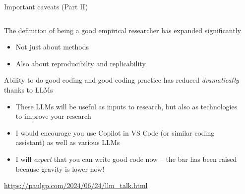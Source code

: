 \documentclass[notes,11pt, aspectratio=169]{beamer}
\newenvironment{wideitemize}{\itemize\addtolength{\itemsep}{10pt}}{\enditemize}
\begin{document}
\begin{frame}{Important caveats (Part II)}
  \begin{columns}[T] %
  \begin{column}{.7\textwidth}
    \begin{wideitemize}
    \item The definition of being a good empirical researcher has expanded significantly
      \begin{itemize}
        \item Not just about methods
        \item Also about reproducibilty and replicability
      \end{itemize}
    \item Ability to do good coding and good coding practice has reduced \emph{dramatically} thanks to LLMs
      \begin{itemize}
        \item These LLMs will be useful as inputs to research, but also as technologies to improve your research
        \item I would encourage you use Copilot in VS Code (or similar coding assistant) as well as various LLMs
        \item I will \emph{expect} that you can write good code now -- the bar has been raised because gravity is lower now!
      \end{itemize}
    \end{wideitemize}
    \url{https://paulgp.com/2024/06/24/llm_talk.html}
  \end{column}%
  \hfill%
  \begin{column}{.28\textwidth}
  \end{column}%
  \end{columns}
  \end{frame}
  
\end{document}
